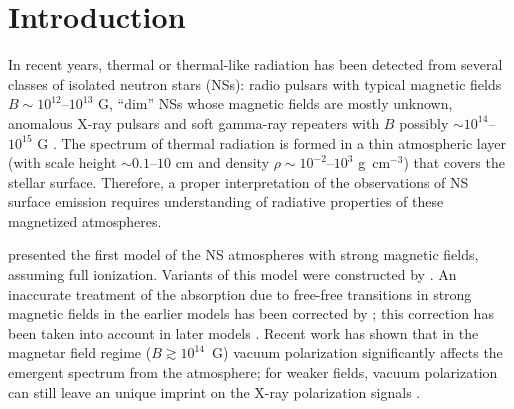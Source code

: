 \documentclass{emulateapj}
\newcommand{\gcc}{\mbox{g cm$^{-3}$}}
\begin{document}
 

\section{Introduction}
\label{sect:intro}

In recent years, thermal or thermal-like radiation has been detected
from several classes of isolated neutron stars (NSs): radio pulsars
with typical magnetic fields $B\sim10^{12}$--$10^{13}$ G, ``dim'' NSs
whose magnetic fields are mostly unknown, anomalous X-ray pulsars and
soft gamma-ray repeaters with $B$ possibly $\sim10^{14}$--$10^{15}$ G 
\citep*[see, e.g.,][
for reviews]{BeckerAschenbach,Haberl-COSPAR,IMS02,PZ03}. The spectrum of
thermal radiation is formed in a thin atmospheric layer (with scale
height $\sim0.1$--$10$ cm and density $\rho\sim10^{-2}$--$10^3$ \gcc)
that covers the stellar surface. Therefore, a proper interpretation of
the observations of NS surface emission requires understanding of
radiative properties of these magnetized atmospheres. 

\citet*{Shib92} \citep*[see also][]{SZ95,Pavlov95} presented the first 
model of the NS atmospheres with strong magnetic fields,
assuming full ionization. Variants of this model were constructed by
\citet*{Zane00,Zane01,HoLai,HoLai02,Ozel01,Lloyd03}. 
An inaccurate treatment of
the absorption due to free-free transitions in strong magnetic fields
in the earlier models \citep{Pavlov95} has been corrected by
\citet{PC03}; this correction has been taken into account in later
models \citep{hoetal03,Ho-COSPAR,Lloyd03}. 
Recent work \citep{HoLai02,LaiHo02,LaiHo03a} has shown that in 
the magnetar field regime ($B\gtrsim 10^{14}$~G) vacuum polarization 
significantly affects the emergent spectrum from the atmosphere;
for weaker fields, vacuum polarization can still leave an unique
imprint on the X-ray polarization signals \citep{LaiHo03b}.
\end{document}
